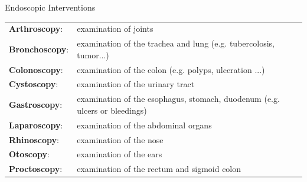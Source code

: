 \begin{frame}{Endoscopic Interventions}

	\begin{tabular}{lp{23em}}
		\textbf{Arthroscopy}:  & examination of joints                                                       \\
		\textbf{Bronchoscopy}: & examination of the trachea and lung (e.g. tubercolosis, tumor...)           \\
		\textbf{Colonoscopy}:  & examination of the colon (e.g. polyps, ulceration ...)                      \\
		\textbf{Cystoscopy}:   & examination of the urinary tract                                            \\
		\textbf{Gastroscopy}:  & examination of the esophagus, stomach, duodenum (e.g. ulcers  or bleedings) \\
		\textbf{Laparoscopy}:  & examination of the abdominal organs                                         \\
		\textbf{Rhinoscopy}:   & examination of the nose                                                     \\
		\textbf{Otoscopy}:     & examination of the ears                                                     \\
		\textbf{Proctoscopy}:  & examination of the rectum and sigmoid colon
	\end{tabular}

\end{frame}










